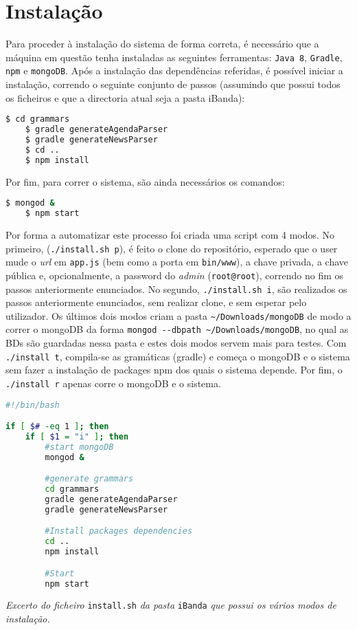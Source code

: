 \section{Instalação}\label{c:instalacao}

Para proceder à instalação do sistema de forma correta, é necessário que a máquina em questão tenha instaladas as seguintes ferramentas: \texttt{Java 8}, \texttt{Gradle}, \texttt{npm} e \texttt{mongoDB}. Após a instalação das dependências referidas, é possível iniciar a instalação, correndo o seguinte conjunto de passos (assumindo que possui todos os ficheiros e que a directoria atual seja a pasta iBanda):
\begin{lstlisting}[language=sh]
    $ cd grammars
    $ gradle generateAgendaParser
    $ gradle generateNewsParser
    $ cd ..
    $ npm install
\end{lstlisting}

Por fim, para correr o sistema, são ainda necessários os comandos:
\begin{lstlisting}[language=sh]
    $ mongod &
    $ npm start
\end{lstlisting}

Por forma a automatizar este processo foi criada uma script com 4 modos. No primeiro, (\verb|./install.sh p|), é feito o clone do repositório, esperado que o user mude o \textit{url} em     \texttt{app.js} (bem como a porta em \verb|bin/www|), a chave privada, a chave pública e, opcionalmente, a password do \textit{admin} (\texttt{root@root}), correndo no fim os passos anteriormente enunciados. No segundo, \verb|./install.sh i|, são realizados os passos anteriormente enunciados, sem realizar clone, e sem esperar pelo utilizador. Os últimos dois modos criam a pasta \verb|~/Downloads/mongoDB| de modo a correr o mongoDB da forma \verb|mongod --dbpath ~/Downloads/mongoDB|, no qual as BDs são guardadas nessa pasta e estes dois modos servem mais para testes. Com \verb|./install t|, compila-se as gramáticas (gradle) e começa o mongoDB e o sistema sem fazer a instalação de packages npm dos quais o sistema depende. Por fim, o \verb|./install r| apenas corre o mongoDB e o sistema.

\begin{framed}
\begin{lstlisting}[language=bash]
#!/bin/bash

if [ $# -eq 1 ]; then
    if [ $1 = "i" ]; then
        #start mongoDB
        mongod &

        #generate grammars
        cd grammars
        gradle generateAgendaParser
        gradle generateNewsParser

        #Install packages dependencies
        cd ..
        npm install

        #Start
        npm start
\end{lstlisting}
\end{framed}

\begin{center}
\textit{Excerto do ficheiro} \texttt{install.sh} \textit{da pasta} \texttt{iBanda} \textit{que possui os vários modos de instalação.}
\end{center}
